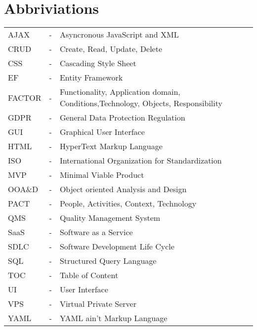 \chapter{Abbriviations}\label{sec:abbrivitation}
\begin{tabular}{ll p{10cm}}
	AJAX & - & Asyncronous JavaScript and XML \\
	CRUD & - & Create, Read, Update, Delete \\
	CSS & - & Cascading Style Sheet\\
	EF & - & Entity Framework \\
	FACTOR & - & Functionality, Application domain, Conditions,\newline Technology, Objects, Responsibility\\
	GDPR & - & General Data Protection Regulation \\
	GUI & - & Graphical User Interface \\
	HTML & - & HyperText Markup Language \\
	ISO & - & International Organization for Standardization\\
	MVP & - & Minimal Viable Product \\
	OOA\&D & - & Object oriented Analysis and Design\\
	PACT & - & People, Activities, Context, Technology \\
	QMS & - & Quality Management System \\
	SaaS & - & Software as a Service \\
	SDLC & - & Software Development Life Cycle \\
	SQL & - & Structured Query Language \\
	TOC & - & Table of Content\\
	UI & - & User Interface\\
	VPS & - & Virtual Private Server\\
	YAML & - & YAML ain't Markup Language\\
	
\end{tabular}